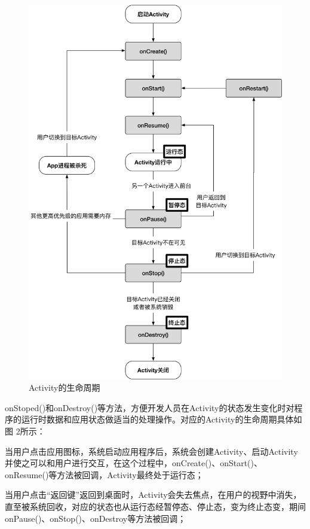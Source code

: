 \begin{figure}
	\centering
	\includegraphics[width=\textwidth]{./Figures/Activity-lifecycle.png}
	\caption{Activity的生命周期}
	\label{fig:Activity-lifecycle}
\end{figure}

onStoped()和onDestroy()等方法，方便开发人员在Activity的状态发生变化时对程序的运行时数据和应用状态做适当的处理操作。对应的Activity的生命周期具体如图 2所示：

当用户点击应用图标，系统启动应用程序后，系统会创建Activity、启动Activity并使之可以和用户进行交互，在这个过程中，onCreate()、onStart()、onResume()等方法被回调，Activity最终处于运行态；

当用户点击“返回键”返回到桌面时，Activity会失去焦点，在用户的视野中消失，直至被系统回收，对应的状态也从运行态经暂停态、停止态，变为终止态变，期间onPause()、onStop()、onDestroy等方法被回调；

